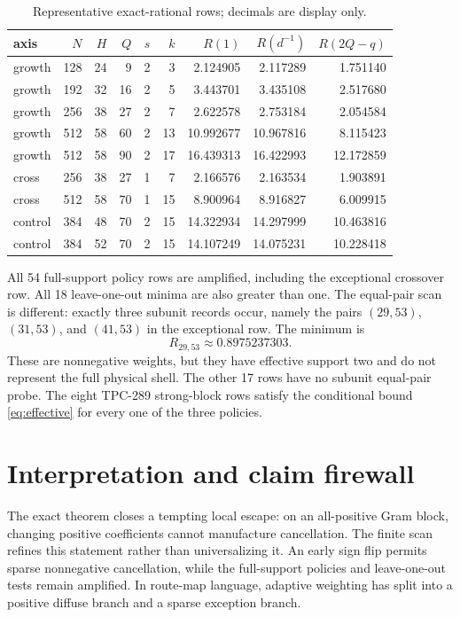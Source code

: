\documentclass[10pt]{article}
\begin{document}
\begin{table}[ht]
\centering
\scriptsize
\begin{tabular}{@{}lrrrrrrrr@{}}
\toprule
axis & $N$ & $H$ & $Q$ & $s$ & $k$ & $R(1)$ & $R(d^{-1})$ & $R(2Q-q)$\\
\midrule
growth &128&24&9 &2&3 &2.124905&2.117289&1.751140\\
growth &192&32&16&2&5 &3.443701&3.435108&2.517680\\
growth &256&38&27&2&7 &2.622578&2.753184&2.054584\\
growth &512&58&60&2&13&10.992677&10.967816&8.115423\\
growth &512&58&90&2&17&16.439313&16.422993&12.172859\\
cross &256&38&27&1&7 &2.166576&2.163534&1.903891\\
cross &512&58&70&1&15&8.900964&8.916827&6.009915\\
control&384&48&70&2&15&14.322934&14.297999&10.463816\\
control&384&52&70&2&15&14.107249&14.075231&10.228418\\
\bottomrule
\end{tabular}
\caption{Representative exact-rational rows; decimals are display only.}
\label{tab:policies}
\end{table}

All 54 full-support policy rows are amplified, including the exceptional
crossover row.  All 18 leave-one-out minima are also greater than one.  The
equal-pair scan is different: exactly three subunit records occur, namely
the pairs $(29,53)$, $(31,53)$, and $(41,53)$ in the exceptional row.  The
minimum is
\[
 R_{29,53}\approx0.8975237303.
\]
These are nonnegative weights, but they have effective support two and do not
represent the full physical shell.  The other 17 rows have no subunit
equal-pair probe.  The eight TPC-289 strong-block rows satisfy the conditional
bound \eqref{eq:effective} for every one of the three policies.

\section{Interpretation and claim firewall}

The exact theorem closes a tempting local escape: on an all-positive Gram
block, changing positive coefficients cannot manufacture cancellation.  The
finite scan refines this statement rather than universalizing it.  An early
sign flip permits sparse nonnegative cancellation, while the full-support
policies and leave-one-out tests remain amplified.  In route-map language,
adaptive weighting has split into a positive diffuse branch and a sparse
exception branch.
\end{document}
